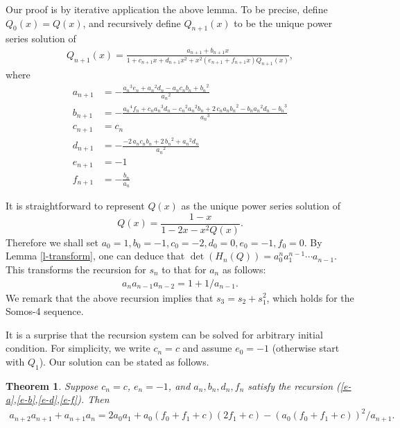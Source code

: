 \documentclass{fpsac}
\newtheorem{theorem}{Theorem}
\begin{document}
Our proof is by iterative application the above lemma. To be
precise, define $Q_0(x)=Q(x)$, and recursively define $Q_{n+1}(x)$
to be the unique power series solution of
\begin{align}
Q_{n+1}(x)
=\frac{a_{n+1}+b_{n+1}x}{1+c_{n+1}x+d_{n+1}x^2+x^2(e_{n+1}+f_{n+1}x)Q_{n+1}(x)},
\end{align}
where
\begin{align}
a_{n+1}&=-{\frac {{a_{n}}^{3}e_{n}+{a_{n}}^{2}d_{n}-a_{n}c_{n}b_{n}+{b_{n}}^{2}}{{a_{n}}^{2}}} \label{e-a}\\
b_{n+1}&=-{\frac {{a_{n}}^{4}f_{n}+c_{n}
{a_{n}}^{3}d_{n}-{c_{n}}^{2}{a_{n}}^{2}b_{n}+2\,c_{n}a_{n}{b_{n}}^{2}-b_{n}{a_{n}}^{2}d_{n}-
{b_{n}}^{3}}{{a_{n}}^{3}}}\label{e-b}
\\
c_{n+1}&=c_{n}\nonumber \\
d_{n+1}&=- {\frac {-2\,a_{n}c_{n}b_{n}+2\,{b_{n}}^{2}+{a_{n}}^{2}d_{n}}{{a_{n}}^{2}}}\label{e-d}\\
e_{n+1}&=-1\nonumber \\
f_{n+1}&=-{\frac {b_{n}}{a_{n}}}\label{e-f}
\end{align}

It is straightforward to represent $Q(x)$ as the unique power series
solution of
$$ Q(x)= \frac{1-x}{1-2x-x^2Q(x)}. $$
Therefore we shall set $a_0=1,b_0=-1,c_0=-2,d_0=0,e_0=-1,f_0=0.$ By
Lemma \ref{l-transform}, one can deduce that
$\det(H_n(Q))=a_0^na_1^{n-1}\cdots a_{n-1}$. This transforms the
recursion for $s_n$ to that for $a_n$ as follows:
\begin{align}
\label{e-rec-a} a_na_{n-1}a_{n-2}=1+1/a_{n-1}.
\end{align}
We remark that the above recursion implies that $s_3=s_2+s_1^2$,
which holds for the Somos-4 sequence.

It is a surprise that the recursion system can be solved for
arbitrary initial condition. For simplicity, we write $c_n=c$ and
assume $e_0=-1$ (otherwise start with $Q_1$). Our solution can be
stated as follows.
\begin{theorem}
\label{t-rec-a} Suppose $c_n=c$, $e_n=-1$, and $a_n,b_n,d_n,f_n$
satisfy the recursion (\ref{e-a},\ref{e-b},\ref{e-d},\ref{e-f}).
Then 
\begin{align}
\label{e-t-rec-a} a_{n+2}a_{n+1}+a_{n+1}a_n =2a_0a_1
+a_0(f_0+f_1+c)(2f_1+c)-(a_0(f_0+f_1+c))^2/a_{n+1}.
\end{align}
\end{theorem}
\end{document}
